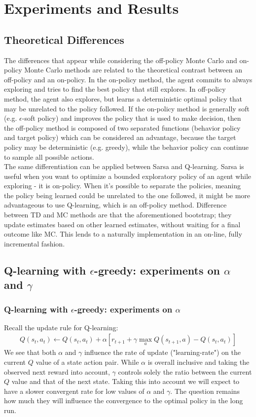 \documentclass[paper=a4, fontsize=11pt]{scrartcl}
\numberwithin{equation}{section}		%
\numberwithin{figure}{section}			%
\numberwithin{table}{section}				%
\begin{document}
\section{Experiments and Results}
\label{results}

\subsection{Theoretical Differences}
The differences that appear while considering the off-policy Monte Carlo and on-policy Monte Carlo methods are related to the theoretical contrast between an off-policy and an on-policy. In the on-policy method, the agent commits to always exploring and tries to find the best policy that still explores. In off-policy method, the agent also explores, but learns a deterministic optimal policy that may be unrelated to the policy followed. If the on-policy  method is generally soft (e.g. $\epsilon$-soft policy) and improves the policy that is used to make decision, then the off-policy method is composed of two separated functions (behavior policy and target policy) which can be considered an advantage, because the target policy may be deterministic (e.g. greedy), while the behavior policy can continue to sample all possible actions. \\
The same differentiation can be applied between Sarsa and Q-learning. Sarsa is useful when you want to optimize a bounded exploratory policy of an agent while exploring - it is on-policy. When it's possible to separate the policies, meaning the policy being learned could be unrelated to the one followed, it might be more advantageous to use Q-learning, which is an off-policy method. Difference between TD and MC methods are that the aforementioned bootstrap; they update estimates based on other learned estimates, without waiting for a final outcome like MC. This lends to a naturally implementation in an on-line, fully incremental fashion.

\subsection{Q-learning with $\epsilon$-greedy: experiments on $\alpha$ and $\gamma$}
\subsubsection*{Q-learning with $\epsilon$-greedy: experiments on $\alpha$}
Recall the update rule for Q-learning:
\begin{align}
Q(s_t,a_t) \leftarrow Q(s_t,a_t)+\alpha[r_{t+1}+\gamma \max_a Q(s_{t+1},a)-Q(s_t,a_t)]
\end{align}
We see that both $\alpha$ and $\gamma$ influence the rate of update ("learning-rate") on the current $Q$ value of a state action pair. While $\alpha$ is overall inclusive and taking the observed next reward into account, $\gamma$ controls solely the ratio between the current $Q$ value and that of the next state. Taking this into account we will expect to have a slower convergent rate for low values of $\alpha$ and $\gamma$. The question remains how much they will influence the convergence to the optimal policy in the long run.
\end{document}
